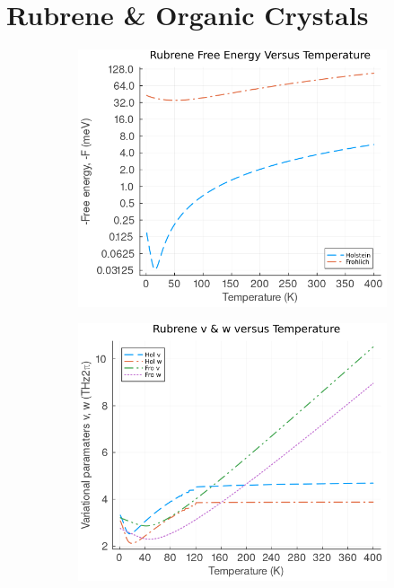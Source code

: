 \section{Rubrene \& Organic Crystals}
\label{sec:chap-sixth-second}

\begin{figure}[!tbp]
    \centering
  \begin{subfigure}[b]{0.49\textwidth}
    \centering
    \includegraphics[width=\textwidth]{figures/rubrene_F_temp.png}
    \label{fig:rubrene_F_temp}
  \end{subfigure}
  \hfill
  \begin{subfigure}[b]{0.49\textwidth}
    \centering
    \includegraphics[width=\textwidth]{figures/rubrene_vw_temp.png}

\end{subfigure}
\end{figure}
